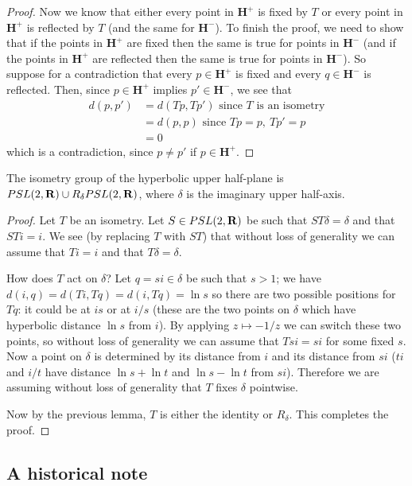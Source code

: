 \documentclass[12pt]{article}
\begin{document}
\begin{proof}
  Now we know that either every point in $\mathbf{H}^+$ is fixed by $T$ or every point in $\mathbf{H}^+$ is reflected by $T$ (and the same for $\mathbf{H}^-$). To finish the proof, we need to show that if the points in $\mathbf{H}^+$ are fixed then the same is true for points in $\mathbf{H}^-$ (and if the points in $\mathbf{H}^+$ are reflected then the same is true for points in $\mathbf{H}^-$). So suppose for a contradiction that every $p\in\mathbf{H}^+$ is fixed and every $q\in\mathbf{H}^-$ is reflected. Then, since $p\in\mathbf{H}^+$ implies $p'\in\mathbf{H}^-$, we see that
\begin{align*}
d(p,p')&=d(Tp,Tp')\mbox{ since }T\mbox{ is an isometry}\\
&=d(p,p)\mbox{ since }Tp=p,\ Tp'=p\\
&=0
\end{align*}
which is a contradiction, since $p\neq p'$ if $p\in\mathbf{H}^+$.
\end{proof}

\begin{thm}
  The isometry group of the hyperbolic upper half-plane is $PSL(2,\mathbf{R})\cup R_{\delta}PSL(2,\mathbf{R})$, where $\delta$ is the imaginary upper half-axis.
\end{thm}
\begin{proof}
  Let $T$ be an isometry. Let $S\in PSL(2,\mathbf{R})$ be such that $ST\delta=\delta$ and that $STi=i$. We see (by replacing $T$ with $ST$) that without loss of generality we can assume that $Ti=i$ and that $T\delta=\delta$.

  How does $T$ act on $\delta$? Let $q=si\in\delta$ be such that $s>1$; we have $d(i,q)=d(Ti,Tq)=d(i,Tq)=\ln s$ so there are two possible positions for $Tq$: it could be at $is$ or at $i/s$ (these are the two points on $\delta$ which have hyperbolic distance $\ln s$ from $i$). By applying $z\mapsto -1/z$ we can switch these two points, so without loss of generality we can assume that $Tsi=si$ for some fixed $s$. Now a point on $\delta$ is determined by its distance from $i$ and its distance from $si$ ($ti$ and $i/t$ have distance $\ln s+\ln t$ and $\ln s-\ln t$ from $si$). Therefore we are assuming without loss of generality that $T$ fixes $\delta$ pointwise.

  Now by the previous lemma, $T$ is either the identity or $R_\delta$. This completes the proof.
\end{proof}

\subsection{A historical note}
\end{document}
